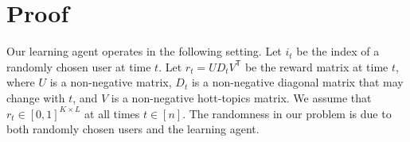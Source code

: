 
\clearpage
\onecolumn
\appendix

\newcommand{\transpose}{^\mathsf{\scriptscriptstyle T}}

\section{Proof}
\label{sec:proof}

Our learning agent operates in the following setting. Let $i_t$ be the index of a randomly chosen user at time $t$. Let $r_t = U D_t V\transpose$ be the reward matrix at time $t$, where $U$ is a non-negative matrix, $D_t$ is a non-negative diagonal matrix that may change with $t$, and $V$ is a non-negative hott-topics matrix. We assume that $r_t \in [0, 1]^{K \times L}$ at all times $t \in [n]$. The randomness in our problem is due to both randomly chosen users and the learning agent.

